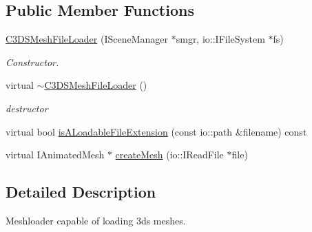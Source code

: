 \subsection*{Public Member Functions}
\begin{DoxyCompactItemize}
\item 
\hypertarget{classirr_1_1scene_1_1_c3_d_s_mesh_file_loader_a3b24cf346ef77c663dee973c9dcd25ad}{\hyperlink{classirr_1_1scene_1_1_c3_d_s_mesh_file_loader_a3b24cf346ef77c663dee973c9dcd25ad}{C3\-D\-S\-Mesh\-File\-Loader} (I\-Scene\-Manager $\ast$smgr, io\-::\-I\-File\-System $\ast$fs)}\label{classirr_1_1scene_1_1_c3_d_s_mesh_file_loader_a3b24cf346ef77c663dee973c9dcd25ad}

\begin{DoxyCompactList}\small\item\em Constructor. \end{DoxyCompactList}\item 
\hypertarget{classirr_1_1scene_1_1_c3_d_s_mesh_file_loader_a5e163721bd770b5adae1600806f8a45a}{virtual \hyperlink{classirr_1_1scene_1_1_c3_d_s_mesh_file_loader_a5e163721bd770b5adae1600806f8a45a}{$\sim$\-C3\-D\-S\-Mesh\-File\-Loader} ()}\label{classirr_1_1scene_1_1_c3_d_s_mesh_file_loader_a5e163721bd770b5adae1600806f8a45a}

\begin{DoxyCompactList}\small\item\em destructor \end{DoxyCompactList}\item 
virtual bool \hyperlink{classirr_1_1scene_1_1_c3_d_s_mesh_file_loader_aa97a466211815b568e20753fdd76b613}{is\-A\-Loadable\-File\-Extension} (const io\-::path \&filename) const 
\item 
virtual I\-Animated\-Mesh $\ast$ \hyperlink{classirr_1_1scene_1_1_c3_d_s_mesh_file_loader_af1568b7b2175b75341cc1063d556237c}{create\-Mesh} (io\-::\-I\-Read\-File $\ast$file)
\end{DoxyCompactItemize}


\subsection{Detailed Description}
Meshloader capable of loading 3ds meshes. 

